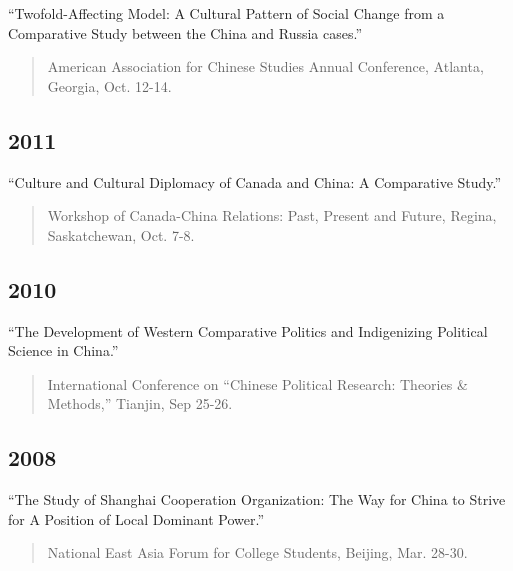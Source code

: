 \documentclass[10.5pt,]{article}
\begin{document}
``Twofold-Affecting Model: A Cultural Pattern of Social Change from a
Comparative Study between the China and Russia cases.''

\begin{quote}
\footnotesize American Association for Chinese Studies Annual
Conference, Atlanta, Georgia, Oct. 12-14.
\end{quote}

\subsection{2011}\label{section-5}

``Culture and Cultural Diplomacy of Canada and China: A Comparative
Study.''

\begin{quote}
\footnotesize Workshop of Canada-China Relations: Past, Present and
Future, Regina, Saskatchewan, Oct. 7-8.
\end{quote}

\subsection{2010}\label{section-6}

``The Development of Western Comparative Politics and Indigenizing
Political Science in China.''

\begin{quote}
\footnotesize International Conference on ``Chinese Political Research:
Theories \& Methods,'' Tianjin, Sep 25-26.
\end{quote}

\subsection{2008}\label{section-7}

``The Study of Shanghai Cooperation Organization: The Way for China to
Strive for A Position of Local Dominant Power.''

\begin{quote}
\footnotesize National East Asia Forum for College Students, Beijing,
Mar. 28-30.
\end{quote}
\end{document}
